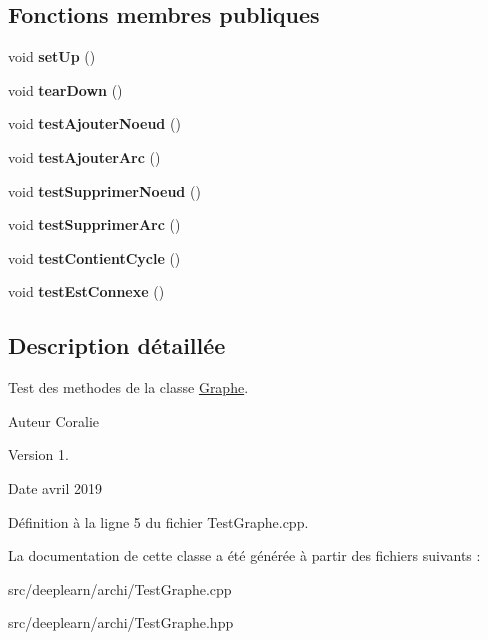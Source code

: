 \subsection*{Fonctions membres publiques}
\begin{DoxyCompactItemize}
\item 
\mbox{\label{class_test_graphe_a45a1f586a78c1620766ff9eadf553d63}} 
void {\bfseries set\+Up} ()
\item 
\mbox{\label{class_test_graphe_a5fc50dc85fdc3620d6e9170cb68b4b6f}} 
void {\bfseries tear\+Down} ()
\item 
\mbox{\label{class_test_graphe_a828faee28311ce705bcf8b5c450ccd09}} 
void {\bfseries test\+Ajouter\+Noeud} ()
\item 
\mbox{\label{class_test_graphe_aeff7e8c6e4bcf503edbb219badd66215}} 
void {\bfseries test\+Ajouter\+Arc} ()
\item 
\mbox{\label{class_test_graphe_af48572064506a5bb25984156d182474e}} 
void {\bfseries test\+Supprimer\+Noeud} ()
\item 
\mbox{\label{class_test_graphe_acec1ab448ef4822fe8071e3f204d8b0b}} 
void {\bfseries test\+Supprimer\+Arc} ()
\item 
\mbox{\label{class_test_graphe_a450232b7d114d0adef2bc0859e74b3dd}} 
void {\bfseries test\+Contient\+Cycle} ()
\item 
\mbox{\label{class_test_graphe_ab45b4ccf11e1f28e94365694323c48f0}} 
void {\bfseries test\+Est\+Connexe} ()
\end{DoxyCompactItemize}


\subsection{Description détaillée}
Test des methodes de la classe \hyperlink{class_graphe}{Graphe}. 

\begin{DoxyAuthor}{Auteur}
Coralie 
\end{DoxyAuthor}
\begin{DoxyVersion}{Version}
1. 
\end{DoxyVersion}
\begin{DoxyDate}{Date}
avril 2019 
\end{DoxyDate}


Définition à la ligne 5 du fichier Test\+Graphe.\+cpp.



La documentation de cette classe a été générée à partir des fichiers suivants \+:\begin{DoxyCompactItemize}
\item 
src/deeplearn/archi/Test\+Graphe.\+cpp\item 
src/deeplearn/archi/Test\+Graphe.\+hpp\end{DoxyCompactItemize}
